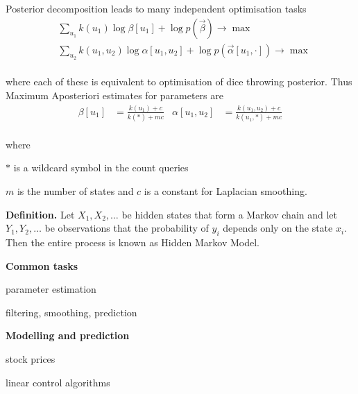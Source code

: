 \documentclass[landscape,footrule]{foils}
\begin{document}
\enlargethispage{4cm}
Posterior decomposition leads to many independent optimisation tasks\vspace*{-2ex}
\begin{align*}
&\sum_{u_1} k(u_1)\log \beta[u_1] + \log p(\vec{\beta})\to\max\\
&\sum_{u_2} k(u_1,u_2)\log\alpha[u_1,u_2]+\log p(\vec{\alpha}[u_1,\cdot])\to\max 
\end{align*}\vspace*{-4ex} \ \\
where each of these is equivalent to optimisation of dice throwing posterior. 
Thus Maximum Aposteriori estimates for parameters are \vspace*{-2ex}
\begin{align*}
\beta[u_1]&=\frac{k(u_1)+c}{k(*)+mc} &
\alpha[u_1,u_2]&=\frac{k(u_1,u_2)+c}{k(u_1,*)+mc}
\end{align*}\vspace*{-4ex}\ \\
where
\begin{triangles}
\item $*$ is a wildcard symbol in the count queries
\item $m$ is the number of  states and $c$ is a constant for Laplacian smoothing. 
\end{triangles}
 

 


\textbf{Definition.}
Let $X_1,X_2,\ldots$ be hidden states that form a Markov chain and let $Y_1,Y_2,\ldots$ be observations that the probability of $y_i$ depends only on the state $x_i$. Then the entire process is known as Hidden Markov Model.\vspace*{1ex}

\textbf{Common tasks}
\begin{triangles}
\item parameter estimation 
\item filtering, smoothing, prediction
\end{triangles}



\textbf{Modelling and prediction}
\begin{triangles}
\item stock prices
\item linear control algorithms 
\end{triangles}\vspace*{2ex}
\end{document}
